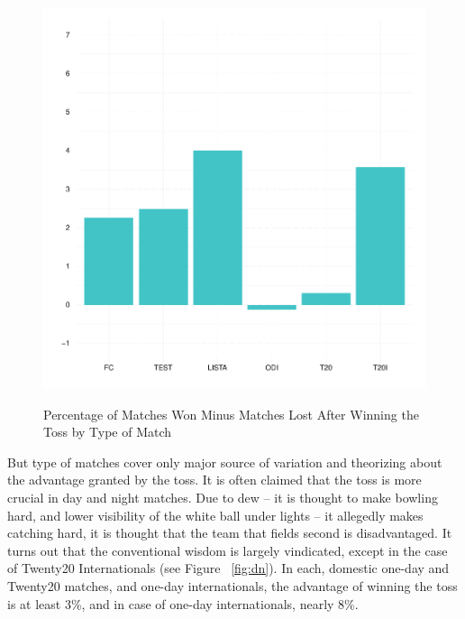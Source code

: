\documentclass[12pt]{article}
\begin{document}
\begin{figure}[htbp]
\centering
\caption{Percentage of Matches Won Minus Matches Lost After Winning the Toss by Type of Match}
\includegraphics[scale=.85]{../figs/winbyType.pdf}
\label{fig:type}
\end{figure}

But type of matches cover only major source of variation and theorizing about the advantage granted by the toss. It is often claimed that the toss is more crucial in day and night matches. Due to dew -- it is thought to make bowling hard, and lower visibility of the white ball under lights -- it allegedly makes catching hard, it is thought that the team that fields second is disadvantaged. It turns out that the conventional wisdom is largely vindicated, except in the case of Twenty20 Internationals (see Figure ~\ref{fig:dn}). In each, domestic one-day and Twenty20 matches, and one-day internationals, the advantage of winning the toss is at least 3\%, and in case of one-day internationals, nearly 8\%.
\end{document}
